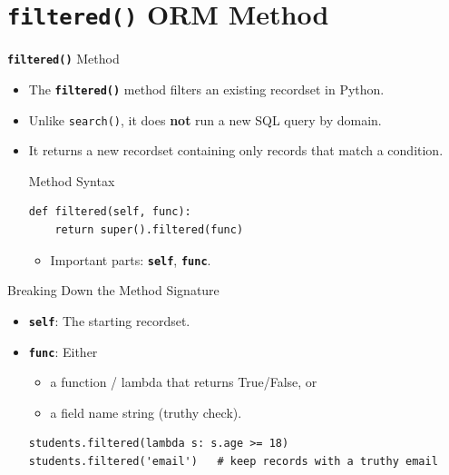 
\section{\textbf{\texttt{filtered()}} ORM Method}

\begin{frame}[fragile]{\textbf{\texttt{filtered()}} Method}
	\begin{itemize}
		\item The \textbf{\texttt{filtered()}} method filters an existing recordset in Python.
		\item Unlike \texttt{search()}, it does \textbf{not} run a new SQL query by domain.
		\item It returns a new recordset containing only records that match a condition.
\begin{block}{Method Syntax}
\begin{lstlisting}
def filtered(self, func):
	return super().filtered(func)
\end{lstlisting}
	\begin{itemize}
		\item Important parts: \textbf{\texttt{self}}, \textbf{\texttt{func}}.
	\end{itemize}
\end{block}
	\end{itemize}
\end{frame}

\begin{frame}[fragile]{Breaking Down the Method Signature}
	\begin{block}{}
		\begin{itemize}
			\item \textbf{\texttt{self}}: The starting recordset.
			\item \textbf{\texttt{func}}: Either
			\begin{itemize}
				\item a function / lambda that returns True/False, or
				\item a field name string (truthy check).
			\end{itemize}
\begin{lstlisting}
students.filtered(lambda s: s.age >= 18)
students.filtered('email')   # keep records with a truthy email
\end{lstlisting}
		\end{itemize}
	\end{block}
\end{frame}


